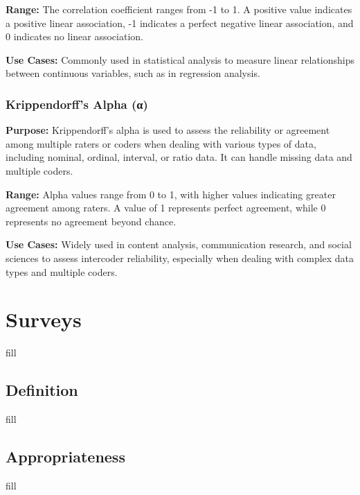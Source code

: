 \documentclass[
  b5paper]{book}
\begin{document}
\textbf{Range:} The correlation coefficient ranges from -1 to 1. A positive value indicates a positive linear association, -1 indicates a perfect negative linear association, and 0 indicates no linear association.

\textbf{Use Cases:} Commonly used in statistical analysis to measure linear relationships between continuous variables, such as in regression analysis.

\hypertarget{krippendorffs-alpha-ux3b1}{%
\subsection*{\texorpdfstring{\textbf{Krippendorff's Alpha (α)}}{Krippendorff's Alpha (α)}}\label{krippendorffs-alpha-ux3b1}}

\textbf{Purpose:} Krippendorff's alpha is used to assess the reliability or agreement among multiple raters or coders when dealing with various types of data, including nominal, ordinal, interval, or ratio data. It can handle missing data and multiple coders.

\textbf{Range:} Alpha values range from 0 to 1, with higher values indicating greater agreement among raters. A value of 1 represents perfect agreement, while 0 represents no agreement beyond chance.

\textbf{Use Cases:} Widely used in content analysis, communication research, and social sciences to assess intercoder reliability, especially when dealing with complex data types and multiple coders.

\hypertarget{surveys-1}{%
\chapter{Surveys}\label{surveys-1}}

fill

\hypertarget{definition}{%
\section{Definition}\label{definition}}

fill

\hypertarget{appropriateness}{%
\section{Appropriateness}\label{appropriateness}}

fill
\end{document}
